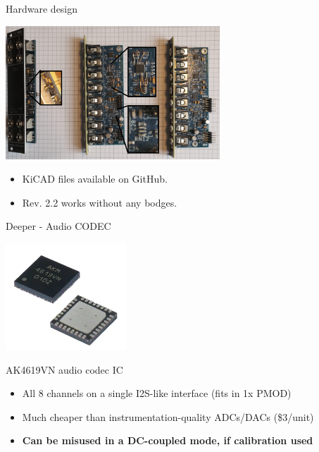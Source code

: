 \documentclass{beamer}
\begin{document}
\begin{frame}{Hardware design}


    \begin{center}
        \includegraphics[height=5cm]{img/oldrevs.png}
    \end{center}

    \begin{itemize}
        \item KiCAD files available on GitHub.
        \item Rev. 2.2 works without any bodges.
    \end{itemize}

\end{frame}

\begin{frame}{Deeper - Audio CODEC}


    \begin{center}
        \includegraphics[height=4cm]{img/ak4619_chip.png}
    \end{center}

    \begin{block}{AK4619VN audio codec IC}
        \begin{itemize}
            \item All 8 channels on a single I2S-like interface (fits in 1x PMOD)
            \item Much cheaper than instrumentation-quality ADCs/DACs (\$3/unit)
            \item \textbf{Can be misused in a DC-coupled mode, if calibration used}
        \end{itemize}
    \end{block}

\end{frame}
\end{document}
